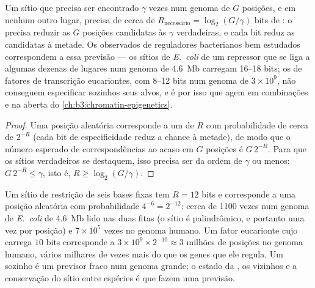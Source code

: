 \begin{proposition}\label{prop:b3:bioinformatics:bits}
Um sítio que precisa ser encontrado $\gamma$ vezes num genoma de $G$
posições, e em nenhum outro lugar, precisa de cerca de
$R_{\text{necessário}} = \log_{2}(G/\gamma)$ bits de : o  precisa reduzir as $G$ posições candidatas às
$\gamma$ verdadeiras, e cada bit reduz as candidatas à metade. Os
 observados de reguladores bacterianos bem estudados
correspondem a essa previsão --- os sítios de \emph{E.~coli} de um
repressor que se liga a algumas dezenas de lugares num genoma de
\qty{4.6}{Mb} carregam \numrange{16}{18} bits; os  de fatores de
transcrição eucariontes, com \numrange{8}{12} bits num genoma de
$3\times 10^{9}$, não conseguem especificar sozinhos seus alvos, e é
por isso que agem em combinações e na  aberta do
\cref{ch:b3:chromatin-epigenetics}.
\end{proposition}
\begin{proof}
Uma posição aleatória corresponde a um  de 
$R$ com probabilidade de cerca de $2^{-R}$ (cada bit de especificidade
reduz a chance à metade), de modo que o número esperado de
correspondências ao acaso em $G$ posições é $G\,2^{-R}$. Para que os
sítios verdadeiros se destaquem, isso precisa ser da ordem de $\gamma$
ou menos: $G\,2^{-R} \le \gamma$, isto é, $R \ge \log_{2}(G/\gamma)$.
\end{proof}

\begin{example}\label{ex:b3:bioinformatics:motif-numbers}
Um sítio de restrição de seis bases fixas tem $R = 12$ bits e
corresponde a uma posição aleatória com probabilidade $4^{-6} = 2^{-12}$: cerca de \num{1100} vezes num genoma de \emph{E.~coli} de
\qty{4.6}{Mb} lido nas duas fitas (o sítio é palindrômico, e portanto
uma vez por posição) e $7\times 10^{5}$ vezes no genoma humano. Um
fator eucarionte cujo  carrega $10$ bits corresponde a
$3\times 10^{9}\times 2^{-10} \approx 3$ milhões de posições no genoma
humano, vários milhares de vezes mais do que os genes que ele regula.
Um  sozinho é um previsor fraco num genoma grande; o estado da
, os  vizinhos e a conservação do sítio entre espécies
é que fazem uma previsão.
\end{example}

